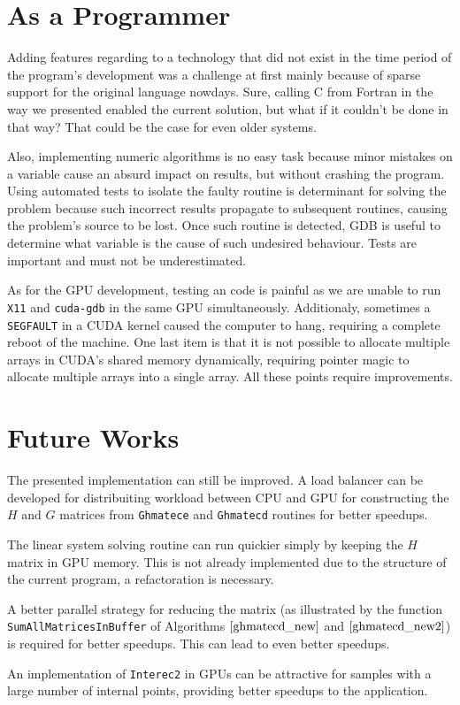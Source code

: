 \section{As a Programmer}

Adding features regarding to a technology that did not exist in the time period of the program's 
development was a challenge at first mainly because of sparse support for the original language nowdays. 
Sure, calling C from Fortran in the way we presented enabled the current solution, 
but what if it couldn't be done in that way? That could be the case for even older systems.

Also, implementing numeric algorithms is no easy task because minor mistakes on a variable cause an 
absurd impact on results, but without crashing the program. Using automated tests to isolate the 
faulty routine is determinant for solving the problem because such incorrect results propagate to 
subsequent routines, causing the problem's source to be lost. Once such routine is detected, GDB 
is useful to determine what variable is the cause of such undesired behaviour. Tests are important 
and must not be underestimated.

As for the GPU development, testing an code is painful as we are unable to run \texttt{X11} and \texttt{cuda-gdb} 
in the same GPU  simultaneously. Additionaly, sometimes a \texttt{SEGFAULT} in a CUDA kernel caused the computer 
to hang, requiring a complete reboot of the machine. 
One last item is that it is not possible to allocate multiple arrays in CUDA's shared memory dynamically, 
requiring pointer magic to allocate multiple arrays into a single array. All these points require improvements. 

\section{Future Works}

The presented implementation can still be improved. A load balancer can be developed for 
distribuiting workload between CPU and GPU for constructing the $H$ and $G$ matrices from 
\texttt{Ghmatece} and \texttt{Ghmatecd} routines for better speedups.  

The linear system solving routine can run quickier simply by keeping the $H$ 
matrix in GPU memory. This is not already implemented due to the structure of the current 
program, a refactoration is necessary.

A better parallel strategy for reducing the matrix (as illustrated by the function \newline 
\texttt{SumAllMatricesInBuffer} of Algorithms $\ref{ghmatecd_new}$ and $\ref{ghmatecd_new2}$) is 
required for better speedups. This can lead to even better speedups.

An implementation of \texttt{Interec2} in GPUs can be attractive for samples with a large number 
of internal points, providing better speedups to the application.
